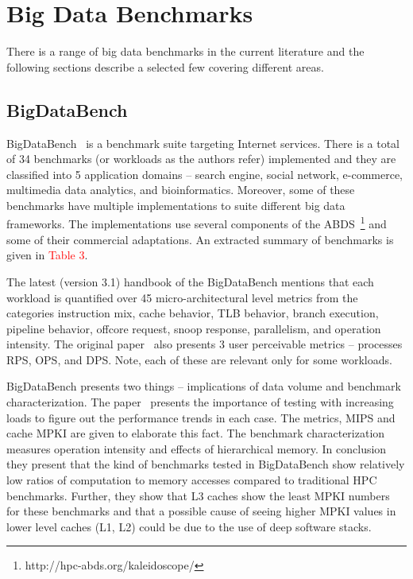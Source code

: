 \section{Big Data Benchmarks}
There is a range of big data benchmarks in the current literature and the following sections describe a selected few covering different areas.

\subsection{BigDataBench}
BigDataBench~\cite{handbookofbigdatabench,DBLP:journals/corr/WangZLZYHGJSZZLZLQ14} is a benchmark suite targeting Internet services. There is a total of 34 benchmarks (or workloads as the authors refer) implemented and they are classified into 5 application domains – search engine, social network, e-commerce, multimedia data analytics, and bioinformatics. Moreover, some of these benchmarks have multiple implementations to suite different big data frameworks. The implementations use several components of the \ac{ABDS}~\footnote{http://hpc-abds.org/kaleidoscope/} and some of their commercial adaptations. An extracted summary of benchmarks is given in \textcolor{red}{Table 3}. 

The latest (version 3.1) handbook of the BigDataBench mentions that each workload is quantified over 45 micro-architectural level metrics from the categories instruction mix, cache behavior, TLB behavior, branch execution, pipeline behavior, offcore request, snoop response, parallelism, and operation intensity. The original paper~\cite{DBLP:journals/corr/WangZLZYHGJSZZLZLQ14} also presents 3 user perceivable metrics – processes \ac{RPS}, \ac{OPS}, and \ac{DPS}. Note, each of these are relevant only for some workloads.


BigDataBench presents two things – implications of data volume and benchmark characterization. The paper~\cite{DBLP:journals/corr/WangZLZYHGJSZZLZLQ14} presents the importance of testing with increasing loads to figure out the performance trends in each case. The metrics, \ac{MIPS} and cache \ac{MPKI} are given to elaborate this fact. The benchmark characterization measures operation intensity and effects of hierarchical memory. In conclusion they present that the kind of benchmarks tested in BigDataBench show relatively low ratios of computation to memory accesses compared to traditional HPC benchmarks. Further, they show that L3 caches show the least \ac{MPKI} numbers for these benchmarks and that a possible cause of seeing higher \ac{MPKI} values in lower level caches (L1, L2) could be due to the use of deep software stacks.

